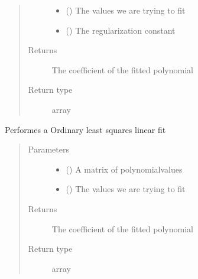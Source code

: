 \documentclass[letterpaper,10pt,english]{sphinxmanual}
\begin{document}
\begin{fulllineitems}
\begin{fulllineitems}
\begin{quote}
\begin{description}
\begin{itemize}
\item {} 
 () \textendash{} The values we are trying to fit

\item {} 
 (\sphinxstyleliteralemphasis{, }) \textendash{} The regularization constant

\end{itemize}

\item[{Returns}] \leavevmode
The coefficient of the fitted polynomial

\item[{Return type}] \leavevmode
array

\end{description}\end{quote}

\end{fulllineitems}


\begin{fulllineitems}
\label{\detokenize{index:cls_reg.LinReg.ols}}
Performes a Ordinary least squares linear fit
\begin{quote}\begin{description}
\item[{Parameters}] \leavevmode\begin{itemize}
\item {} 
 () \textendash{} A matrix of polynomialvalues

\item {} 
 () \textendash{} The values we are trying to fit

\end{itemize}

\item[{Returns}] \leavevmode
The coefficient of the fitted polynomial

\item[{Return type}] \leavevmode
array

\end{description}\end{quote}

\end{fulllineitems}


\end{fulllineitems}
\end{document}
